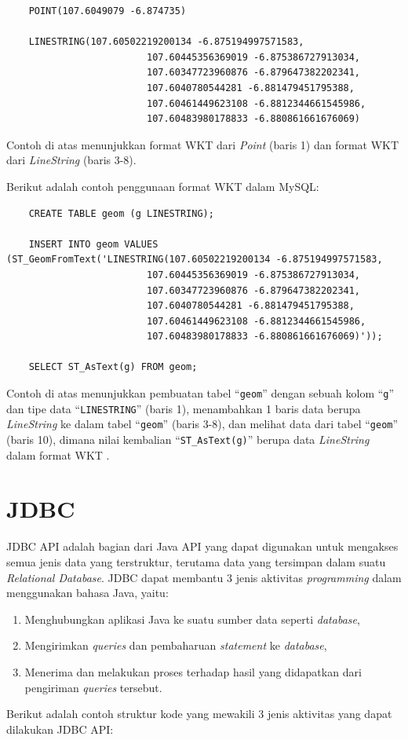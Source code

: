 \begin{lstlisting}
	POINT(107.6049079 -6.874735)
	
	LINESTRING(107.60502219200134 -6.875194997571583, 
						 107.60445356369019 -6.875386727913034,
						 107.60347723960876 -6.879647382202341,
						 107.6040780544281 -6.881479451795388,
						 107.60461449623108 -6.8812344661545986,
						 107.60483980178833 -6.880861661676069)
\end{lstlisting}

Contoh di atas menunjukkan format WKT dari \textit{Point} (baris 1) dan format WKT dari \textit{LineString} (baris 3-8).

Berikut adalah contoh penggunaan format WKT dalam MySQL:

\begin{lstlisting}
	CREATE TABLE geom (g LINESTRING);

	INSERT INTO geom VALUES (ST_GeomFromText('LINESTRING(107.60502219200134 -6.875194997571583, 
						 107.60445356369019 -6.875386727913034,
						 107.60347723960876 -6.879647382202341,
						 107.6040780544281 -6.881479451795388,
						 107.60461449623108 -6.8812344661545986,
						 107.60483980178833 -6.880861661676069)'));
	
	SELECT ST_AsText(g) FROM geom;
\end{lstlisting}

Contoh di atas menunjukkan pembuatan tabel ``\texttt{geom}'' dengan sebuah kolom ``\texttt{g}'' dan tipe data ``\texttt{LINESTRING}'' (baris 1), menambahkan 1 baris data berupa \textit{LineString} ke dalam tabel ``\texttt{geom}'' (baris 3-8), dan melihat data dari tabel ``\texttt{geom}'' (baris 10), dimana nilai kembalian ``\texttt{ST\_AsText(g)}'' berupa data \textit{LineString} dalam format WKT .



\section{JDBC}
\label{sec:jdbc}
JDBC API adalah bagian dari Java API yang dapat digunakan untuk mengakses semua jenis data yang terstruktur, terutama data yang tersimpan dalam suatu \textit{Relational Database}\cite{jdbc}. JDBC dapat membantu 3 jenis aktivitas \textit{programming} dalam menggunakan bahasa Java, yaitu:
\begin{enumerate}
	\item Menghubungkan aplikasi Java ke suatu sumber data seperti \textit{database},
	\item Mengirimkan \textit{queries} dan pembaharuan \textit{statement} ke \textit{database},
	\item Menerima dan melakukan proses terhadap hasil yang didapatkan dari pengiriman \textit{queries} tersebut.
\end{enumerate}
Berikut adalah contoh struktur kode yang mewakili 3 jenis aktivitas yang dapat dilakukan JDBC API:

